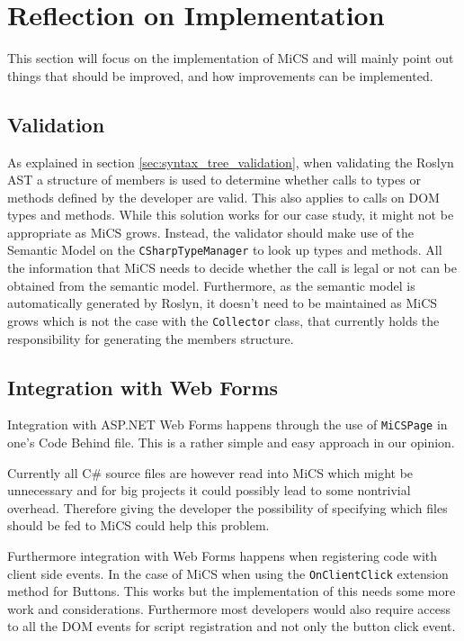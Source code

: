 \section{Reflection on Implementation} %
\label{sec:reflection_on_implementation}
This section will focus on the implementation of MiCS and will mainly point out things that should be improved, and how improvements can be implemented.

\subsection{Validation} %
\label{ssub:validation}
As explained in section \ref{sec:syntax_tree_validation}, when validating the Roslyn AST a structure of members is used to determine whether calls to types or methods defined by the developer are valid. This also applies to calls on DOM types and methods. While this solution works for our case study, it might not be appropriate as MiCS grows. Instead, the validator should make use of the Semantic Model on the \texttt{CSharpTypeManager} to look up types and methods. All the information that MiCS needs to decide whether the call is legal or not can be obtained from the semantic model. Furthermore, as the semantic model is automatically generated by Roslyn, it doesn't need to be maintained as MiCS grows which is not the case with the \texttt{Collector} class, that currently holds the responsibility for generating the members structure.

\subsection{Integration with Web Forms} %
\label{ssub:integration_with_web_forms}
	Integration with ASP.NET Web Forms happens through the use of \texttt{MiCSPage} in one's Code Behind file. This is a rather simple and easy approach in our opinion. 

	Currently all C\# source files are however read into MiCS which might be unnecessary and for big projects it could possibly lead to some nontrivial overhead. Therefore giving the developer the possibility of specifying which files should be fed to MiCS could help this problem.

	Furthermore integration with Web Forms happens when registering code with client side events. In the case of MiCS when using the \texttt{OnClientClick} extension method for Buttons. This works but the implementation of this needs some more work and considerations. Furthermore most developers would also require access to all the DOM events for script registration and not only the button click event.

